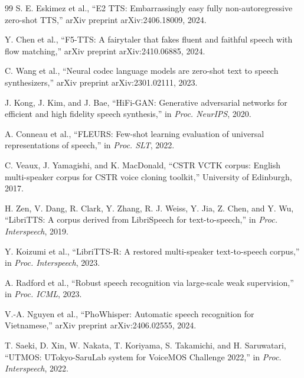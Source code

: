 \documentclass[10pt,twoside]{article}
\begin{document}
\begin{thebibliography}{99}
S. E. Eskimez et al., ``E2 TTS: Embarrassingly easy fully non-autoregressive
zero-shot TTS,'' arXiv preprint arXiv:2406.18009, 2024.

Y. Chen et al., ``F5-TTS: A fairytaler that fakes fluent and faithful speech
with flow matching,'' arXiv preprint arXiv:2410.06885, 2024.

C. Wang et al., ``Neural codec language models are zero-shot text to speech
synthesizers,'' arXiv preprint arXiv:2301.02111, 2023.

J. Kong, J. Kim, and J. Bae, ``HiFi-GAN: Generative adversarial networks for
efficient and high fidelity speech synthesis,'' in \emph{Proc. NeurIPS}, 2020.

A. Conneau et al., ``FLEURS: Few-shot learning evaluation of universal
representations of speech,'' in \emph{Proc. SLT}, 2022.

C. Veaux, J. Yamagishi, and K. MacDonald, ``CSTR VCTK corpus: English
multi-speaker corpus for CSTR voice cloning toolkit,'' University of Edinburgh,
2017.

H. Zen, V. Dang, R. Clark, Y. Zhang, R. J. Weiss, Y. Jia, Z. Chen, and Y. Wu,
``LibriTTS: A corpus derived from LibriSpeech for text-to-speech,'' in
\emph{Proc. Interspeech}, 2019.

Y. Koizumi et al., ``LibriTTS-R: A restored multi-speaker text-to-speech
corpus,'' in \emph{Proc. Interspeech}, 2023.

A. Radford et al., ``Robust speech recognition via large-scale weak
supervision,'' in \emph{Proc. ICML}, 2023.

V.-A. Nguyen et al., ``PhoWhisper: Automatic speech recognition for
Vietnamese,'' arXiv preprint arXiv:2406.02555, 2024.

T. Saeki, D. Xin, W. Nakata, T. Koriyama, S. Takamichi, and H. Saruwatari,
``UTMOS: UTokyo-SaruLab system for VoiceMOS Challenge 2022,'' in
\emph{Proc. Interspeech}, 2022.
\end{thebibliography}
\end{document}
